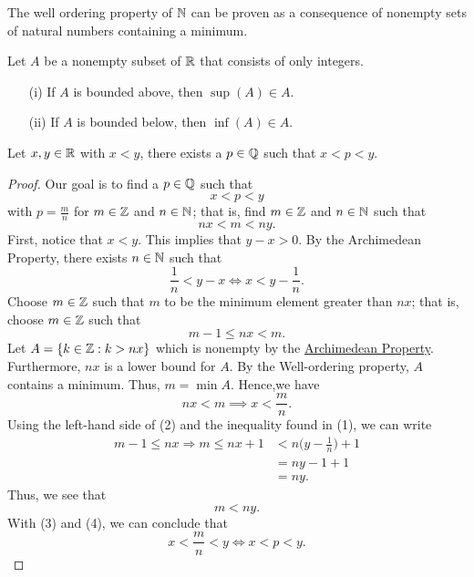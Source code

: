 \documentclass[a4paper]{report}
\begin{document}
\begin{remark}
   The well ordering property of \( \mathbb{N}  \) can be proven as a consequence of nonempty sets of natural numbers containing a minimum.
\end{remark}

\begin{corollary}
  Let \( A  \) be a nonempty subset of \( \R  \) that consists of only integers.  
  \begin{enumerate}
      \item[(i)] If \( A  \) is bounded above, then \( \sup(A) \in A  \).
      \item[(ii)] If \( A  \) is bounded below, then \( \inf(A) \in A  \). 
  \end{enumerate}
\end{corollary}

\begin{theorem}[Density of \( \Q  \) in \( \R  \)]
    Let \( x,y \in \mathbb{R}  \) with \( x < y  \), there exists a \( p \in \mathbb{Q}  \) such that \( x < p < y \). 
\end{theorem}
\begin{proof}
    Our goal is to find a \( p \in \mathbb{Q}  \) such that  
    \[  x < p < y \]
    with \( p = \frac{ m }{ n }  \) for \( m \in \mathbb{Z}  \) and \( n \in \mathbb{N}  \); that is, find \( m \in \mathbb{Z}  \) and \( n \in \mathbb{N}  \) such that 
    \[  nx < m < ny. \]
    First, notice that \( x < y  \). This implies that \( y - x > 0  \). By the Archimedean Property, there exists \( n \in \mathbb{N}  \) such that
    \[  \frac{ 1 }{ n }  < y - x \Longleftrightarrow x < y - \frac{ 1 }{ n }. \tag{1}    \]
    Choose \( m \in \mathbb{Z}  \) such that \( m  \) to be the minimum element greater than \( nx  \); that is, choose \( m \in \mathbb{Z}  \) such that 
    \[  m - 1 \leq nx < m. \tag{2} \]
    Let \( A = \{ k \in \mathbb{Z} : k > nx  \}  \) which is nonempty by the {\hyperref[Archimedean Property]{Archimedean Property}}. Furthermore, \( nx  \) is a lower bound for \( A  \). By the Well-ordering property, \( A \) contains a minimum. Thus, \( m = \min A  \). Hence,we have  
    \[  nx < m \implies x < \frac{ m }{ n }. \tag{3} \]
    Using the left-hand side of (2) and the inequality found in (1), we can write
    \begin{align*}
        m - 1 \leq nx \Longrightarrow m \leq nx +1 &< n \Big(  y - \frac{ 1 }{ n }  \Big) + 1   \\
                      &= ny -  1 + 1 \\
                      &= ny.
    \end{align*}
    Thus, we see that 
    \[ m < ny \tag{4}.  \]
    With (3) and (4), we can conclude that
    \[ x < \frac{ m }{ n }  < y  \Longleftrightarrow x < p < y.  \]

\end{proof}
\end{document}

